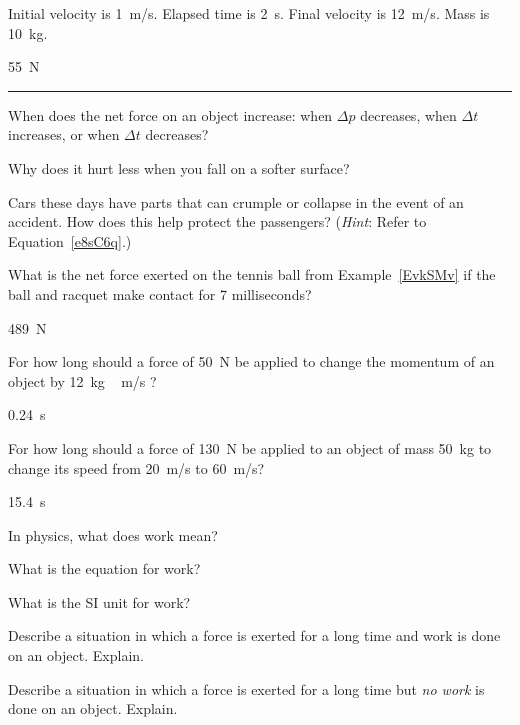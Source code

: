 \documentclass[]{exam}
\begin{document}
\begin{questions}
\question \label{I7jORB}
Initial velocity is \SI{1}{m/s}. Elapsed time is \SI{2}{s}. Final velocity is \SI{12}{m/s}.  Mass is \SI{10}{kg}.

\begin{solution}
\SI{55}{N}
\end{solution}

\bigskip
\hrule


\question
When does the net force on an object increase: when $\Delta p$ decreases, when $\Delta t$ increases, or when $\Delta t$ decreases?


\question
Why does it hurt less when you fall on a softer surface?


\question
Cars these days have parts that can crumple or collapse in the event of an accident. How does this help protect the passengers? (\textit{Hint}: Refer to Equation~\ref{e8sC6q}.)


\question \label{e2TgS9}
What is the net force exerted on the tennis ball from Example~\ref{EvkSMv} if the ball and racquet make contact for 7 milliseconds?

\begin{solution}
\SI{489}{N}
\end{solution}

\question \label{2lAWwf}
For how long should a force of \SI{50}{N}  be applied to change the momentum of an object by \SI{12}{kg\,m/s} ?

\begin{solution}
\SI{0.24}{s}
\end{solution}

\question \label{6e43y6}
For how long should a force of \SI{130}{N} be applied to an object of mass \SI{50}{kg} to change its speed from \SI{20}{m/s} to \SI{60}{m/s}?

\begin{solution}
\SI{15.4}{s}
\end{solution}


\question \label{S3zmkv}
In physics, what does work mean?


\question
What is the equation for work?


\question
What is the SI unit for work?


\question
Describe a situation in which a force is exerted for a long time and work is done on an object. Explain.


\question \label{g5xjKT}
Describe a situation in which a force is exerted for a long time but \textit{no work} is done on an object. Explain.



\end{questions}
\end{document}
